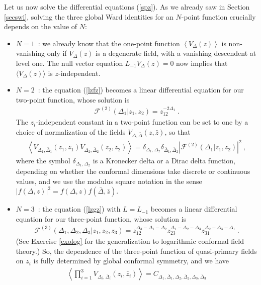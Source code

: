 \documentclass[12pt,a4paper,notitlepage]{report}
\newcommand \la {\left\langle}
\newcommand \ra {\right\rangle}
\numberwithin{equation}{section}
\theoremstyle{break}
\begin{document}
Let us now solve the differential equations (\ref{spz}). As we already saw in Section \ref{secswi}, solving the three global Ward identities for an $N$-point function crucially depends on the value of $N$:
\begin{itemize}
 \item $\boxed{N=1}$\ : we already know that the one-point function $\la V_\Delta(z)\ra$ is non-vanishing only if $V_\Delta(z)$ is a degenerate field, with a vanishing descendent at level one. The null vector equation $L_{-1}V_\Delta(z)=0$ now implies that $\langle V_\Delta(z)\rangle$ is $z$-independent.
\item $\boxed{N=2}$\ : the equation (\ref{lzfz}) becomes a linear differential equation for our two-point function, whose solution is 
\begin{align}
 \boxed{\mathcal{F}^{(2)}(\Delta_1|z_1,z_2) = z_{12}^{-2\Delta_1}}\ .
\label{fzz}
\end{align}
The $z_i$-independent constant in a two-point function can be set to one by a choice of normalization of the fields $V_{\Delta,\bar{\Delta}}(z,\bar{z})$, so that 
\begin{align}
 \la V_{\Delta_1,\bar{\Delta}_1}(z_1,\bar{z}_1) V_{\Delta_2,\bar{\Delta}_2}(z_2,\bar{z}_2)\ra = \delta_{\Delta_1,\Delta_2}\delta_{\bar{\Delta}_1,\bar{\Delta}_2} \left|\mathcal{F}^{(2)}(\Delta_1|z_1,z_2)\right|^2\ ,
\end{align}
where the symbol $\delta_{\Delta_1,\Delta_2}$ is a Kronecker delta or a Dirac delta function, depending on whether the conformal dimensions take discrete or continuous values, and we use the modulus square notation in the sense $|f(\Delta,z)|^2 = f(\Delta,z)f(\bar{\Delta},\bar{z})$.
\item $\boxed{N=3}$\ : the equation (\ref{lzgz}) with $L=L_{-1}$ becomes a linear differential equation for our three-point function, whose solution is 
\begin{align}
 \boxed{\mathcal{F}^{(3)}(\Delta_1,\Delta_2,\Delta_3|z_1,z_2,z_3) = z_{12}^{\Delta_3-\Delta_1-\Delta_2} z_{23}^{\Delta_1-\Delta_2-\Delta_3} z_{31}^{\Delta_2-\Delta_3-\Delta_1}}\ .
\label{fzzz}
\end{align}
(See Exercise \ref{exolog} for the generalization to logarithmic conformal field theory.) 
So, the dependence of the three-point function of quasi-primary fields on $z_i$ is fully determined by global conformal symmetry, and we have 
\begin{align}
 \la \prod_{i=1}^3 V_{\Delta_i,\bar{\Delta}_i}(z_i,\bar{z}_i) \ra = C_{\Delta_1,\bar{\Delta}_1,\Delta_2,\bar{\Delta}_2,\Delta_3,\bar{\Delta}_3}

\end{align}
\end{itemize}
\end{document}
